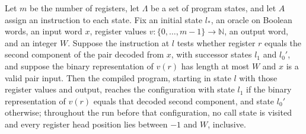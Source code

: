 \begin{lemma}
\label{Complexity.LogProg.sim_jeqSnd}
\leanok
{}
Let $m$ be the number of registers, let $\Lambda$ be a set of program states, and let
$A$ assign an instruction to each state. Fix an initial state $l_*$, an oracle on
Boolean words, an input word $x$, register values
$v\colon\{0,\ldots,m-1\}\to\mathbb{N}$, an output word, and an integer $W$. Suppose the
instruction at $l$ tests whether register $r$ equals the second component of the pair
decoded from $x$, with successor states $l_1$ and $l_0'$, and suppose the binary
representation of $v(r)$ has length at most $W$ and $x$ is a valid pair input. Then the
compiled program, starting in state $l$ with those register values and output, reaches
the configuration with state $l_1$ if the binary representation of $v(r)$ equals that
decoded second component, and state $l_0'$ otherwise; throughout the run before that
configuration, no call state is visited and every register head position lies between
$-1$ and $W$, inclusive.
\end{lemma}

